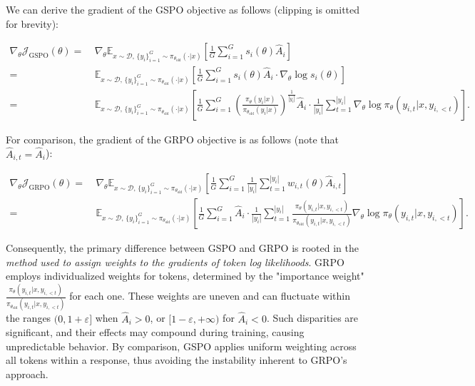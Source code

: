 We can derive the gradient of the GSPO objective as follows (clipping is omitted for brevity):

\begin{align}
\nabla_{\theta} \mathcal{J}_\text{GSPO} (\theta)
=&\ 
\nabla_{\theta} \mathbb{E}_{ x \sim \mathcal{D},\, \{y_i\}_{i=1}^G \sim \pi_{\theta_\text{old}}( \cdot | x) }
\left[ 
\frac{1}{G} \sum_{i=1}^{G} s_{i}(\theta) \widehat{A}_{i}
\right] \\
= &\ 
\mathbb{E}_{ x \sim \mathcal{D},\, \{y_i\}_{i=1}^G \sim \pi_{\theta_\text{old}}( \cdot | x) }
\left[ 
\frac{1}{G} \sum_{i=1}^{G}
s_{i}(\theta) \widehat{A}_{i}
\cdot \nabla_{\theta} \log s_{i}(\theta)
\right] \\
=&\ 
\mathbb{E}_{ x \sim \mathcal{D},\, \{y_i\}_{i=1}^G \sim \pi_{\theta_\text{old}}( \cdot | x) }
\left[ 
\frac{1}{G} \sum_{i=1}^{G} 
\left( \frac{ \pi_{\theta} (y_i | x) }{ \pi_{\theta_\text{old}} (y_i | x)} \right)^{\frac{1}{|y_i|}} \widehat{A}_{i} 
\cdot \frac{1}{|y_i|} \sum_{t=1}^{|y_i|} \nabla_{\theta} \log \pi_{\theta} (y_{i,t} | x, y_{i,<t}) 
\right].
\label{equ:gspo_grad}
\end{align}

For comparison, the gradient of the GRPO objective is as follows (note that $\widehat{A}_{i,t} = \widehat{A}_{i}$):

\begin{align}
\nabla_{\theta} \mathcal{J}_\text{GRPO} (\theta) 
=&\ 
\nabla_{\theta} \mathbb{E}_{ x \sim \mathcal{D},\, \{y_i\}_{i=1}^G \sim \pi_{\theta_\text{old}}( \cdot | x) }
\left[ \frac{1}{G} \sum_{i=1}^{G} \frac{1}{|y_i|} \sum_{t=1}^{|y_i|} 
w_{i,t}(\theta) \widehat{A}_{i,t}
\right] \\
=&\
\mathbb{E}_{ x \sim \mathcal{D},\, \{y_i\}_{i=1}^G \sim \pi_{\theta_\text{old}}( \cdot | x) }
\left[ \frac{1}{G} \sum_{i=1}^{G} \widehat{A}_{i} 
\cdot \frac{1}{|y_i|} \sum_{t=1}^{|y_i|} 
\frac{ \pi_{\theta} (y_{i,t} | x, y_{i,<t}) }{ \pi_{\theta_\text{old}} (y_{i,t} | x,y_{i,<t})} 
\nabla_{\theta} \log \pi_{\theta} (y_{i,t} | x, y_{i,<t})  
\right].
\end{align}

Consequently, the primary difference between GSPO and GRPO is rooted in the \textit{method used to assign weights to the gradients of token log likelihoods}. GRPO employs individualized weights for tokens, determined by the "importance weight" $\frac{ \pi_{\theta} (y_{i,t} | x, y_{i,<t}) }{ \pi_{\theta_\text{old}} (y_{i,t} | x,y_{i,<t})}$ for each one. These weights are uneven and can fluctuate within the ranges $(0, 1+\varepsilon]$ when $\widehat{A}_{i} >0$, or $[1-\varepsilon, +\infty)$ for $\widehat{A}_{i} < 0$. Such disparities are significant, and their effects may compound during training, causing unpredictable behavior. By comparison, GSPO applies uniform weighting across all tokens within a response, thus avoiding the instability inherent to GRPO’s approach.

